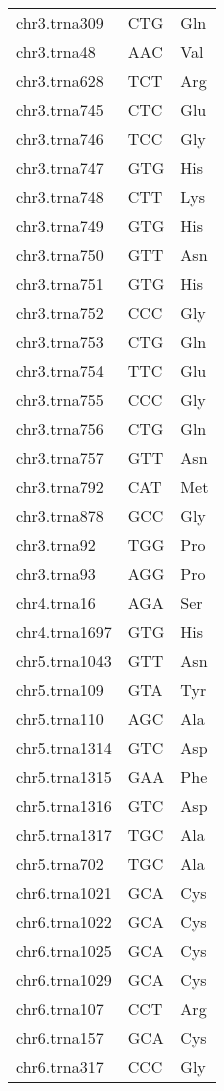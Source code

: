 \begin{longtable}{@{}l>{\collectcell\anticodon}l<{\endcollectcell}l@{}}
    chr3.trna309 & CTG & Gln \\
    chr3.trna48 & AAC & Val \\
    chr3.trna628 & TCT & Arg \\
    chr3.trna745 & CTC & Glu \\
    chr3.trna746 & TCC & Gly \\
    chr3.trna747 & GTG & His \\
    chr3.trna748 & CTT & Lys \\
    chr3.trna749 & GTG & His \\
    chr3.trna750 & GTT & Asn \\
    chr3.trna751 & GTG & His \\
    chr3.trna752 & CCC & Gly \\
    chr3.trna753 & CTG & Gln \\
    chr3.trna754 & TTC & Glu \\
    chr3.trna755 & CCC & Gly \\
    chr3.trna756 & CTG & Gln \\
    chr3.trna757 & GTT & Asn \\
    chr3.trna792 & CAT & Met \\
    chr3.trna878 & GCC & Gly \\
    chr3.trna92 & TGG & Pro \\
    chr3.trna93 & AGG & Pro \\
    chr4.trna16 & AGA & Ser \\
    chr4.trna1697 & GTG & His \\
    chr5.trna1043 & GTT & Asn \\
    chr5.trna109 & GTA & Tyr \\
    chr5.trna110 & AGC & Ala \\
    chr5.trna1314 & GTC & Asp \\
    chr5.trna1315 & GAA & Phe \\
    chr5.trna1316 & GTC & Asp \\
    chr5.trna1317 & TGC & Ala \\
    chr5.trna702 & TGC & Ala \\
    chr6.trna1021 & GCA & Cys \\
    chr6.trna1022 & GCA & Cys \\
    chr6.trna1025 & GCA & Cys \\
    chr6.trna1029 & GCA & Cys \\
    chr6.trna107 & CCT & Arg \\
    chr6.trna157 & GCA & Cys \\
    chr6.trna317 & CCC & Gly \\

\end{longtable}
